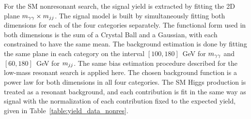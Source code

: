 For the SM nonresonant search, the signal yield is extracted by fitting the 2D plane
$m_{\gamma\gamma} \times m_{jj}$. The signal model is built by simultaneously fitting both dimensions
for each of the four categories separately.
The functional form used in both dimensions is the sum of a Crystal Ball and
a Gaussian, with each constrained to have the same mean. The background estimation is done by fitting
the same plane in each category on the interval $[100, 180]$~GeV for $m_{\gamma\gamma}$ and $[60, 180]$~GeV
for $m_{jj}$. The same bias estimation procedure
described for the low-mass resonant search is applied here. The chosen background function is a power
law for both dimensions in all four categories. The SM Higgs production is treated as a resonant
background, and each contribution is fit in the same way as signal with the normalization
of each contribution fixed to the expected yield, given in Table~\ref{table:yield_data_nonres}.

